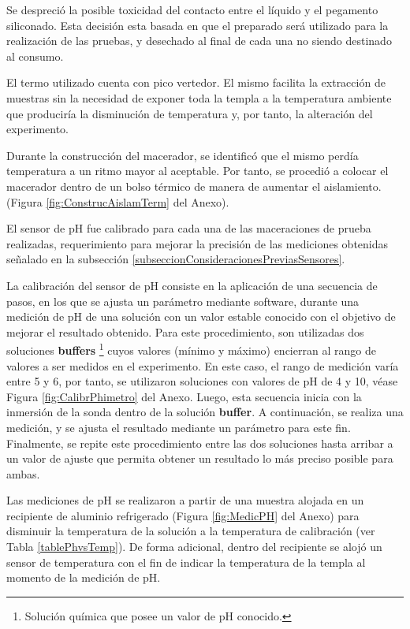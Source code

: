         \par Se despreció la posible toxicidad del contacto entre el líquido y el pegamento siliconado. Esta decisión esta basada en que el preparado será utilizado para la realización de las pruebas, y desechado al final de cada una no siendo destinado  al consumo.
        
        \par El termo utilizado cuenta con pico vertedor. El mismo facilita la extracción de muestras sin la necesidad de exponer toda la templa a la temperatura ambiente que produciría la disminución de temperatura y, por tanto, la alteración del experimento.
        
        \par Durante la construcción del macerador, se identificó que el mismo perdía temperatura a un ritmo mayor al aceptable. Por tanto, se procedió a colocar el macerador dentro de un bolso térmico de manera de aumentar el aislamiento. (Figura \ref{fig:ConstrucAislamTerm} del Anexo).
        
        \par El sensor de pH fue calibrado para cada una de las maceraciones de prueba realizadas, requerimiento para mejorar la precisión de las mediciones obtenidas señalado en la subsección \ref{subseccionConsideracionesPreviasSensores}.
        
        \par La calibración del sensor de pH consiste en la aplicación de una secuencia de pasos, en los que se ajusta un parámetro mediante software, durante una medición de pH de una solución con un valor estable conocido con el objetivo de mejorar el resultado obtenido. Para este procedimiento, son utilizadas dos soluciones \textbf{buffers} \footnote{Solución química que posee un valor de pH conocido.} cuyos valores (mínimo y máximo) encierran al rango de valores a ser medidos en el experimento. En este caso, el rango de medición varía entre 5 y 6, por tanto, se utilizaron soluciones con valores de pH de 4 y 10, véase Figura \ref{fig:CalibrPhimetro} del Anexo. Luego, esta secuencia inicia con la inmersión de la sonda dentro de la solución \textbf{buffer}. A continuación, se realiza una medición, y se ajusta el resultado mediante un parámetro para este fin. Finalmente, se repite este procedimiento entre las dos soluciones hasta arribar a un valor de ajuste que permita obtener un resultado lo más preciso posible para ambas.
        
        \par Las mediciones de pH se realizaron a partir de una muestra alojada en un recipiente de aluminio refrigerado (Figura \ref{fig:MedicPH} del Anexo) para disminuir la temperatura de la solución a la temperatura de calibración (ver Tabla \ref{tablePhvsTemp}). De forma adicional, dentro del recipiente se alojó un sensor de temperatura con el fin de indicar la temperatura de la templa al momento de la medición de pH.
        
